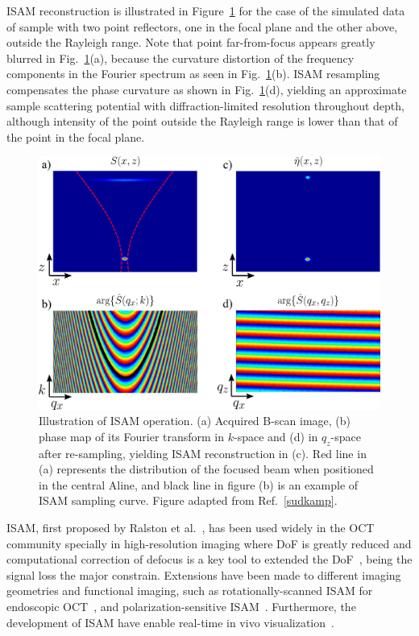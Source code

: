 ISAM reconstruction is illustrated in Figure~\ref{fig:ISAM} for the case of the simulated data of sample with two point reflectors, one in the focal plane and the other above, outside the Rayleigh range. Note that point far-from-focus appears greatly blurred in Fig.~\ref{fig:ISAM}(a), because the curvature distortion of the frequency components in the Fourier spectrum as seen in Fig.~\ref{fig:ISAM}(b). ISAM resampling compensates the phase curvature as shown in Fig.~\ref{fig:ISAM}(d), yielding an approximate sample scattering potential with diffraction-limited resolution throughout depth, although intensity of the point outside the Rayleigh range is lower than that of the point in the focal plane.

\begin{figure}[htb!]
    \centering
    \includegraphics[width=.75\textwidth]{Figures/TheoreticalBasis/ISAM.pdf}
    \caption{Illustration of ISAM operation. (a) Acquired B-scan image, (b) phase map of its Fourier transform in $k$-space and (d) in $q_z$-space after re-sampling, yielding ISAM reconstruction in (c). Red line in (a) represents the distribution of the focused beam when positioned in the central Aline, and black line in figure (b) is an example of ISAM sampling curve. Figure adapted from Ref.~\ref{sudkamp}.}
    \label{fig:ISAM}
\end{figure}
\fi

ISAM, first proposed by Ralston et al.~\cite{Ralston2006_Interferometric}, has been used widely in the OCT community specially in high-resolution imaging where DoF is greatly reduced and computational correction of defocus is a key tool to extended the DoF~\cite{Liu2014_Computed, Boppart2015_Computational, Yi2019_Structure, Zysk2015_Intraoperative}, being the signal loss the major constrain. Extensions have been made to different imaging geometries and functional imaging, such as rotationally-scanned ISAM for endoscopic OCT~\cite{Marks2006_Inverse-1, Marks2006_Inverse}, and polarization-sensitive ISAM~\cite{Davis2007_Polarimetric}. Furthermore, the development of ISAM have enable real-time in vivo visualization~\cite{Ralston2008_Realtime, Ralston2013_Interferometric, St.Marie2013_Robust}. 

